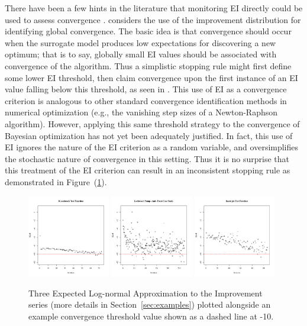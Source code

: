 \documentclass[AMA,Times1COL]{WileyNJDv5} %
\begin{document}
%
There have been a few hints in the literature that monitoring EI directly could
be used to assess convergence \citep{jonesEIOpt}. \cite{taddyOpt} considers the
use of the improvement distribution for identifying global convergence. The
basic idea is that convergence should occur when the surrogate model produces
low expectations for discovering a new optimum; that is to say, globally small
EI values should be associated with convergence of the algorithm. Thus a
simplistic stopping rule might first define some lower EI threshold, then claim
convergence upon the first instance of an EI value falling below this threshold,
as seen in \cite{windExample}. This use of EI as a convergence criterion is
analogous to other standard convergence identification methods in numerical
optimization (e.g., the vanishing step sizes of a Newton-Raphson algorithm).
However, applying this same threshold strategy to the convergence of Bayesian
optimization has not yet been adequately justified. In fact, this use of EI
ignores the nature of the EI criterion as a random variable, and oversimplifies
the stochastic nature of convergence in this setting. Thus it is no surprise
that this treatment of the EI criterion can result in an inconsistent stopping
rule as demonstrated in \mbox{Figure (\ref{introFig}).}

%
%
\begin{figure}[htb]
\includegraphics[width=0.32\textwidth]{./figures/introChartRoseEasyEasyAxis.pdf}
\includegraphics[width=0.32\textwidth]{./figures/introChartLock6Three20000Axis.pdf}
\includegraphics[width=0.32\textwidth]{./figures/introChartRastHardAxis.pdf}
\caption{
%
Three Expected Log-normal Approximation to the Improvement series (more details 
in Section~\ref{sec:examples}) plotted alongside an example convergence 
threshold value shown as a dashed line at -10.
}
\label{introFig}
\end{figure}
%
%
\end{document}
